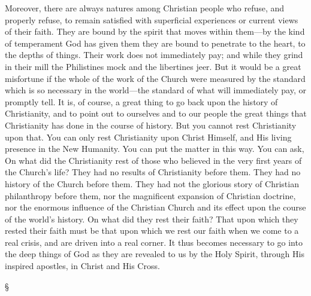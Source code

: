 \documentclass[12pt,a5paper,twoside,titlepage]{book}
\begin{document}
Moreover, there are always natures among 
Christian people who refuse, and properly 
refuse, to remain satisfied with superficial 
experiences or current views of their faith. 
They are bound by the spirit that moves 
within them---by the kind of temperament God 
has given them they are bound to penetrate 
to the heart, to the depths of things. Their 
work does not immediately pay; and while they 
grind in their mill the Philistines mock and the 
libertines jeer. But it would be a great misfortune 
if the whole of the work of the Church 
were measured by the standard which is so 
necessary in the world---the standard of what 
will immediately pay, or promptly tell. It is, 
of course, a great thing to go back upon the 
history of Christianity, and to point out to ourselves 
and to our people the great things that 
Christianity has done in the course of history. 
But you cannot rest Christianity upon that. 
You can only rest Christianity upon Christ 
Himself, and His living presence in the New 
Humanity. You can put the matter in this 
way. You can ask, On what did the Christianity 
rest of those who believed in the very 
first years of the Church's life? They had no 
results of Christianity before them. They had 
no history of the Church before them. They 
had not the glorious story of Christian 
philanthropy before them, nor the magnificent 
expansion of Christian doctrine, nor the enormous
influence of the Christian Church and its 
effect upon the course of the world's history. 
On what did they rest their faith? That upon 
which they rested their faith must be that upon 
which we rest our faith when we come to a 
real crisis, and are driven into a real corner. 
It thus becomes necessary to go into the deep 
things of God as they are revealed to us by the 
Holy Spirit, through His inspired apostles, in 
Christ and His Cross. 

\begin{center}
\S
\end{center}
\end{document}
